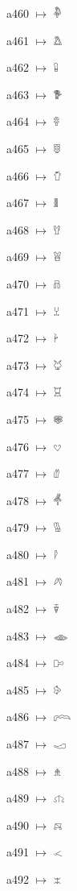 {\noindent a460 $\mapsto$ {\ahfont 𔘃}\par
\noindent a461 $\mapsto$ {\ahfont 𔘄}\par
\noindent a462 $\mapsto$ {\ahfont 𔘅}\par
\noindent a463 $\mapsto$ {\ahfont 𔘆}\par
\noindent a464 $\mapsto$ {\ahfont 𔘇}\par
\noindent a465 $\mapsto$ {\ahfont 𔘈}\par
\noindent a466 $\mapsto$ {\ahfont 𔘉}\par
\noindent a467 $\mapsto$ {\ahfont 𔘊}\par
\noindent a468 $\mapsto$ {\ahfont 𔘋}\par
\noindent a469 $\mapsto$ {\ahfont 𔘌}\par
\noindent a470 $\mapsto$ {\ahfont 𔘍}\par
\noindent a471 $\mapsto$ {\ahfont 𔘎}\par
\noindent a472 $\mapsto$ {\ahfont 𔘏}\par
\noindent a473 $\mapsto$ {\ahfont 𔘐}\par
\noindent a474 $\mapsto$ {\ahfont 𔘑}\par
\noindent a475 $\mapsto$ {\ahfont 𔘒}\par
\noindent a476 $\mapsto$ {\ahfont 𔘓}\par
\noindent a477 $\mapsto$ {\ahfont 𔘔}\par
\noindent a478 $\mapsto$ {\ahfont 𔘕}\par
\noindent a479 $\mapsto$ {\ahfont 𔘖}\par
\noindent a480 $\mapsto$ {\ahfont 𔘗}\par
\noindent a481 $\mapsto$ {\ahfont 𔘘}\par
\noindent a482 $\mapsto$ {\ahfont 𔘙}\par
\noindent a483 $\mapsto$ {\ahfont 𔘚}\par
\noindent a484 $\mapsto$ {\ahfont 𔘛}\par
\noindent a485 $\mapsto$ {\ahfont 𔘜}\par
\noindent a486 $\mapsto$ {\ahfont 𔘝}\par
\noindent a487 $\mapsto$ {\ahfont 𔘞}\par
\noindent a488 $\mapsto$ {\ahfont 𔘟}\par
\noindent a489 $\mapsto$ {\ahfont 𔘠}\par
\noindent a490 $\mapsto$ {\ahfont 𔘡}\par
\noindent a491 $\mapsto$ {\ahfont 𔘢}\par
\noindent a492 $\mapsto$ {\ahfont 𔘣}\par
}
